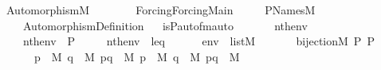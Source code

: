 %
\begin{isabellebody}%
%
%
\isadelimtheory
%
\endisadelimtheory
%
\isatagtheory
{}\isamarkupfalse%
\ Automorphism{\isacharunderscore}{\kern0pt}M\isanewline
\ \ \ \isanewline
\ \ \ \ {\isachardoublequoteopen}Forcing{\isacharslash}{\kern0pt}Forcing{\isacharunderscore}{\kern0pt}Main{\isachardoublequoteclose}\ \isanewline
\ \ \ \ P{\isacharunderscore}{\kern0pt}Names{\isacharunderscore}{\kern0pt}M\isanewline
\ \ \ \ Automorphism{\isacharunderscore}{\kern0pt}Definition\isanewline
{}%
\endisatagtheory
{\isafoldtheory}%
%
\isadelimtheory
\ \isanewline
%
\endisadelimtheory
\isanewline
{}\isamarkupfalse%
\ is{\isacharunderscore}{\kern0pt}P{\isacharunderscore}{\kern0pt}auto{\isacharunderscore}{\kern0pt}fm{\isacharunderscore}{\kern0pt}auto{\isacharcolon}{\kern0pt}\isanewline
\ \ \isanewline
\ \ \ \ {\isachardoublequoteopen}nth{\isacharparenleft}{\kern0pt}{}{\isacharcomma}{\kern0pt}env{\isacharparenright}{\kern0pt}\ {\isacharequal}{\kern0pt}\ {\isasympi}{\isachardoublequoteclose}\ \isanewline
\ \ \ \ {\isachardoublequoteopen}nth{\isacharparenleft}{\kern0pt}{}{\isacharcomma}{\kern0pt}env{\isacharparenright}{\kern0pt}\ {\isacharequal}{\kern0pt}\ P{\isachardoublequoteclose}\ \isanewline
\ \ \ \ {\isachardoublequoteopen}nth{\isacharparenleft}{\kern0pt}{}{\isacharcomma}{\kern0pt}env{\isacharparenright}{\kern0pt}\ {\isacharequal}{\kern0pt}\ leq{\isachardoublequoteclose}\ \ \isanewline
\ \ \ \ {\isachardoublequoteopen}env\ {\isasymin}\ list{\isacharparenleft}{\kern0pt}M{\isacharparenright}{\kern0pt}{\isachardoublequoteclose}\isanewline
\ \ \isanewline
\ \ \ \ {\isachardoublequoteopen}{\isacharparenleft}{\kern0pt}bijection{\isacharparenleft}{\kern0pt}{\isacharhash}{\kern0pt}{\isacharhash}{\kern0pt}M{\isacharcomma}{\kern0pt}\ P{\isacharcomma}{\kern0pt}\ P{\isacharcomma}{\kern0pt}\ {\isasympi}{\isacharparenright}{\kern0pt}\ {\isasymand}\ \isanewline
\ \ \ \ \ \ {\isacharparenleft}{\kern0pt}{\isasymforall}p\ {\isasymin}\ M{\isachardot}{\kern0pt}\ {\isasymforall}q\ {\isasymin}\ M{\isachardot}{\kern0pt}\ {\isasymforall}p{\isacharunderscore}{\kern0pt}q\ {\isasymin}\ M{\isachardot}{\kern0pt}\ {\isasymforall}{\isasympi}p\ {\isasymin}\ M{\isachardot}{\kern0pt}\ {\isasymforall}{\isasympi}q\ {\isasymin}\ M{\isachardot}{\kern0pt}\ {\isasymforall}{\isasympi}p{\isacharunderscore}{\kern0pt}{\isasympi}q\ {\isasymin}\ M{\isachardot}{\kern0pt}\ \isanewline

\end{isabellebody}
